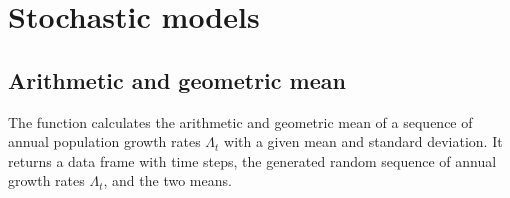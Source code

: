 \documentclass[
]{book}
\newenvironment{Shaded}{\begin{snugshade}}{\end{snugshade}}
\newcommand{\AttributeTok}[1]{\textcolor[rgb]{0.77,0.63,0.00}{#1}}
\newcommand{\ControlFlowTok}[1]{\textcolor[rgb]{0.13,0.29,0.53}{\textbf{#1}}}
\newcommand{\DecValTok}[1]{\textcolor[rgb]{0.00,0.00,0.81}{#1}}
\newcommand{\FunctionTok}[1]{\textcolor[rgb]{0.00,0.00,0.00}{#1}}
\newcommand{\NormalTok}[1]{#1}
\newcommand{\OtherTok}[1]{\textcolor[rgb]{0.56,0.35,0.01}{#1}}
\newcommand{\SpecialCharTok}[1]{\textcolor[rgb]{0.00,0.00,0.00}{#1}}
\begin{document}
\begin{Shaded}
\end{Shaded}

\hypertarget{stochastic-models}{%
\section{Stochastic models}\label{stochastic-models}}

\hypertarget{arithmetic-and-geometric-mean-1}{%
\subsection{Arithmetic and geometric mean}\label{arithmetic-and-geometric-mean-1}}

The function calculates the arithmetic and geometric mean of a sequence of annual population growth rates \(\Lambda_t\) with a given mean and standard deviation. It returns a data frame with time steps, the generated random sequence of annual growth rates \(\Lambda_t\), and the two means.
\end{document}
